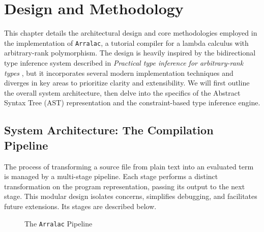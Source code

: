 \chapter{Design and Methodology}
\label{chap:DesignAndMethodology}

This chapter details the architectural design and core methodologies employed in the implementation of \texttt{Arralac}, a tutorial compiler for a lambda calculus with arbitrary-rank polymorphism. The design is heavily inspired by the bidirectional type inference system described in \textit{Practical type inference for arbitrary-rank types} \cite{jones-practical-2007}, but it incorporates several modern implementation techniques and diverges in key areas to prioritize clarity and extensibility. We will first outline the overall system architecture, then delve into the specifics of the Abstract Syntax Tree (AST) representation and the constraint-based type inference engine.

\section{System Architecture: The Compilation Pipeline}
\label{sec:Design:Pipeline}

The process of transforming a source file from plain text into an evaluated term is managed by a multi-stage pipeline. Each stage performs a distinct transformation on the program representation, passing its output to the next stage. This modular design isolates concerns, simplifies debugging, and facilitates future extensions. Its stages are described below.

\begin{figure}[h!]
  \centering
  \caption{The \texttt{Arralac} Pipeline}
  \label{fig:pipeline}
\end{figure}


